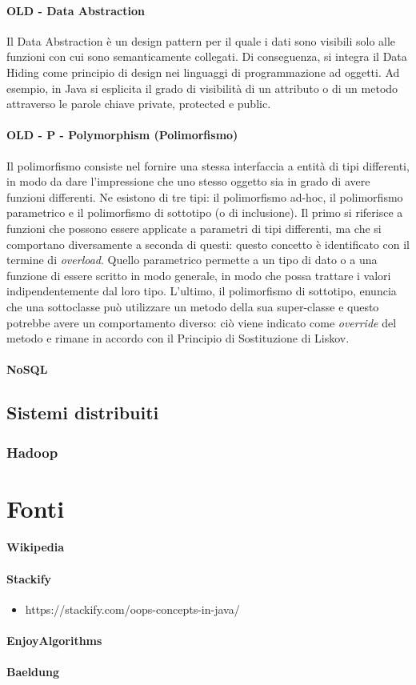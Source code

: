\documentclass{article}
\begin{document}
            \paragraph{OLD - Data Abstraction} Il Data Abstraction è un design pattern per il quale i dati sono visibili solo alle funzioni con cui sono semanticamente collegati. Di conseguenza, si integra il Data Hiding come principio di design nei linguaggi di programmazione ad oggetti. Ad esempio, in Java si esplicita il grado di visibilità di un attributo o di un metodo attraverso le parole chiave private, protected e public.
            \paragraph{OLD - P - Polymorphism (Polimorfismo)} Il polimorfismo consiste nel fornire una stessa interfaccia a entità di tipi differenti, in modo da dare l'impressione che uno stesso oggetto sia in grado di avere funzioni differenti. Ne esistono di tre tipi: il polimorfismo ad-hoc, il polimorfismo parametrico e il polimorfismo di sottotipo (o di inclusione). Il primo si riferisce a funzioni che possono essere applicate a parametri di tipi differenti, ma che si comportano diversamente a seconda di questi: questo concetto è identificato con il termine di \textit{overload}. Quello parametrico permette a un tipo di dato o a una funzione di essere scritto in modo generale, in modo che possa trattare i valori indipendentemente dal loro tipo. L'ultimo, il polimorfismo di sottotipo, enuncia che una sottoclasse può utilizzare un metodo della sua super-classe e questo potrebbe avere un comportamento diverso: ciò viene indicato come \textit{override} del metodo e rimane in accordo con il Principio di Sostituzione di Liskov.
            \paragraph{NoSQL}
    \subsection{Sistemi distribuiti}
        \subsubsection{Hadoop}
    
    \section{Fonti}
        \paragraph{Wikipedia}
        \paragraph{Stackify}
            \begin{itemize}
                \item https://stackify.com/oops-concepts-in-java/
            \end{itemize} 
        \paragraph{EnjoyAlgorithms}
        \paragraph{Baeldung}
            
            
            
\end{document}
